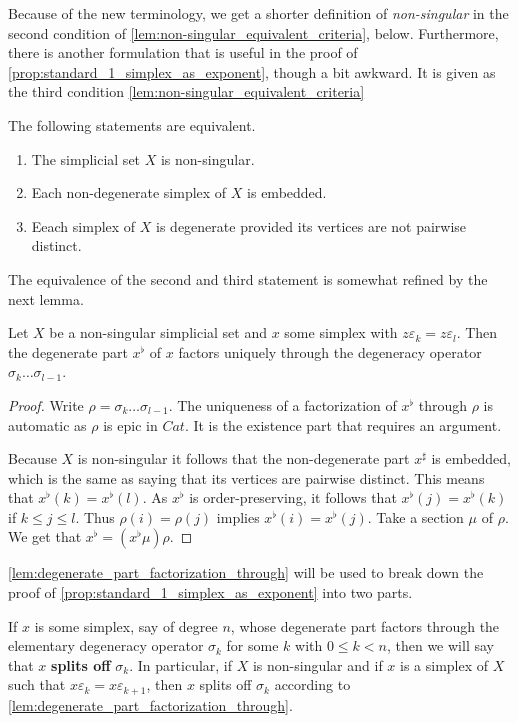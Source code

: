 Because of the new terminology, we get a shorter definition of \emph{non-singular} in the second condition of \cref{lem:non-singular_equivalent_criteria}, below. Furthermore, there is another formulation that is useful in the proof of \cref{prop:standard_1_simplex_as_exponent}, though a bit awkward. It is given as the third condition \cref{lem:non-singular_equivalent_criteria}
\begin{lemma}\label{lem:non-singular_equivalent_criteria}
The following statements are equivalent.
\begin{enumerate}
\item{The simplicial set $X$ is non-singular.}
\item{Each non-degenerate simplex of $X$ is embedded.}
\item{Eeach simplex of $X$ is degenerate provided its vertices are not pairwise distinct.}
\end{enumerate}
\end{lemma}
\noindent The equivalence of the second and third statement is somewhat refined by the next lemma.
\begin{lemma}\label{lem:degenerate_part_factorization_through}
Let $X$ be a non-singular simplicial set and $x$ some simplex with $z\varepsilon _k=z\varepsilon _l$. Then the degenerate part $x^\flat$ of $x$ factors uniquely through the degeneracy operator $\sigma _k\dots \sigma _{l-1}$.
\end{lemma}
\begin{proof}
Write $\rho =\sigma _k\dots \sigma _{l-1}$. The uniqueness of a factorization of $x^\flat$ through $\rho$ is automatic as $\rho$ is epic in $Cat$. It is the existence part that requires an argument.

Because $X$ is non-singular it follows that the non-degenerate part $x^\sharp$ is embedded, which is the same as saying that its vertices are pairwise distinct. This means that $x^\flat (k)=x^\flat (l)$. As $x^\flat$ is order-preserving, it follows that $x^\flat (j)=x^\flat (k)$ if $k\leq j\leq l$. Thus $\rho (i)=\rho (j)$ implies $x^\flat (i)=x^\flat (j)$. Take a section $\mu$ of $\rho$. We get that $x^\flat =(x^\flat \mu )\rho$.
\end{proof}
\noindent \cref{lem:degenerate_part_factorization_through} will be used to break down the proof of \cref{prop:standard_1_simplex_as_exponent} into two parts.

If $x$ is some simplex, say of degree $n$, whose degenerate part factors through the elementary degeneracy operator $\sigma _k$ for some $k$ with $0\leq k<n$, then we will say that $x$ \textbf{splits off} $\sigma _k$. In particular, if $X$ is non-singular and if $x$ is a simplex of $X$ such that $x\varepsilon _k=x\varepsilon _{k+1}$, then $x$ splits off $\sigma _k$ according to \cref{lem:degenerate_part_factorization_through}.

